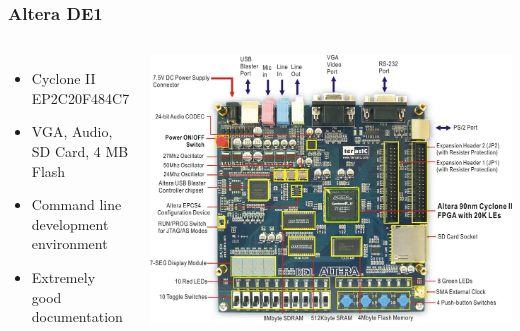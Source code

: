 \documentclass{beamer}
\begin{document}
\begin{frame}
    \frametitle{Altera DE1}

    \begin{columns}[c]
            \begin{itemize}
                \item Cyclone II EP2C20F484C7
                \item VGA, Audio, SD Card, 4 MB Flash
                \item Command line development environment
                \item Extremely good documentation
            \end{itemize}

            \includegraphics[width=\textwidth]{de1.jpg}
    \end{columns}
\end{frame}
\end{document}

